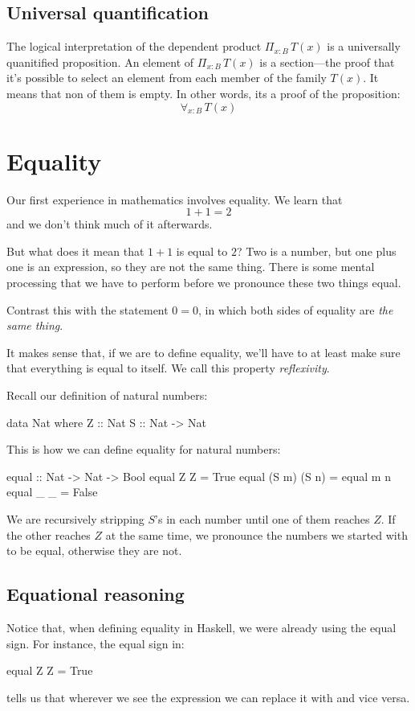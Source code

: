 \documentclass[DaoFP]{subfiles}
\begin{document}
\subsection{Universal quantification}

The logical interpretation of the dependent product $\Pi_{x : B} \, T(x)$ is a universally quanitified proposition. An element of $\Pi_{x : B} \, T(x)$ is a section---the proof that it's possible to select an element from each member of the family $T(x)$. It means that non of them is empty. In other words, its a proof of the proposition:
\[ \forall_{x : B}\, T(x) \]

\section{Equality}

Our first experience in mathematics involves equality. We learn that 
\[1+1=2\] 
and we don't think much of it afterwards. 

But what does it mean that $1+1$ is equal to $2$? Two is a number, but one plus one is an expression, so they are not the same thing. There is some mental processing that we have to perform before we pronounce these two things equal. 

Contrast this with the statement $0 = 0$, in which both sides of equality are \emph{the same thing}. 

It makes sense that, if we are to define equality, we'll have to at least make sure that everything is equal to itself. We call this property \emph{reflexivity}. 

Recall our definition of natural numbers:
\begin{haskell}
data Nat where
  Z :: Nat
  S :: Nat -> Nat
\end{haskell}
This is how we can define equality for natural numbers:
\begin{haskell}
equal :: Nat -> Nat -> Bool
equal Z Z = True
equal (S m) (S n) = equal m n
equal _ _ = False
\end{haskell}
We are recursively stripping $S$'s in each number until one of them reaches $Z$. If the other reaches $Z$ at the same time, we pronounce the numbers we started with to be equal, otherwise they are not. 

\subsection{Equational reasoning}

Notice that, when defining equality in Haskell, we were already using the equal sign. For instance, the equal sign in:
\begin{haskell}
equal Z Z = True
\end{haskell}
tells us that wherever we see the expression  we can replace it with  and vice versa. 
\end{document}
